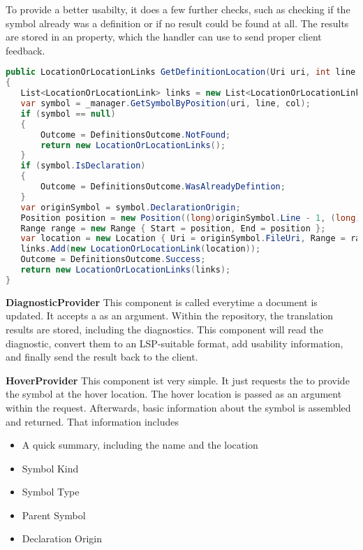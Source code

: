 To provide a better usabilty, it does a few further checks, such as checking if the symbol already was a definition or if no result could be found at all. The results are stored in an  property, which the handler can use to send proper client feedback.

\begin{lstlisting}[language=csharp, caption={Providing Goto Definition}, captionpos=b, label={lst:gotoCore}]
public LocationOrLocationLinks GetDefinitionLocation(Uri uri, int line, int col)
{
   List<LocationOrLocationLink> links = new List<LocationOrLocationLink>();
   var symbol = _manager.GetSymbolByPosition(uri, line, col);
   if (symbol == null)
   {
       Outcome = DefinitionsOutcome.NotFound;
       return new LocationOrLocationLinks();
   }
   if (symbol.IsDeclaration)
   {
       Outcome = DefinitionsOutcome.WasAlreadyDefintion;
   }
   var originSymbol = symbol.DeclarationOrigin;
   Position position = new Position((long)originSymbol.Line - 1, (long)originSymbol.ColumnStart - 1);
   Range range = new Range { Start = position, End = position };
   var location = new Location { Uri = originSymbol.FileUri, Range = range };
   links.Add(new LocationOrLocationLink(location));
   Outcome = DefinitionsOutcome.Success;
   return new LocationOrLocationLinks(links);
}
\end{lstlisting}

\textbf{DiagnosticProvider}
This component is called everytime a document is updated. It accepts a  as an argument. Within the repository, the translation results are stored, including the diagnostics. This component will read the diagnostic, convert them to an LSP-suitable format, add usability information, and finally send the result back to the client.

\intnote{}

\textbf{HoverProvider}
This component ist very simple. It just requests the  to provide the symbol at the hover location. The hover location is passed as an argument within the request. Afterwards, basic information about the symbol is assembled and returned. That information includes \begin{itemize}
    \item A quick summary, including the name and the location
    \item Symbol Kind
    \item Symbol Type
    \item Parent Symbol
    \item Declaration Origin
\end{itemize}

